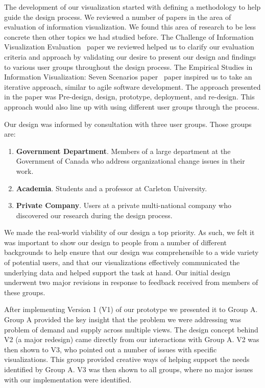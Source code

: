 \documentclass[journal]{vgtc}                %
\begin{document}
The development of our visualization started with defining a methodology to help guide the design process.  We reviewed a number of papers in the area of evaluation of information visualization.  We found this area of research to be less concrete then other topics we had studied before.  The Challenge of Information Visualization Evaluation~\cite{challengeofinfoviseval} paper we reviewed helped us to clarify our evaluation criteria and approach by validating our desire to present our design and findings to various user groups throughout the design process.  The Empirical Studies in Information Visualization: Seven Scenarios paper~\cite{lam2012empirical} paper inspired us to take an iterative approach, similar to agile software development.  The approach presented in the paper was Pre-design, design, prototype, deployment, and re-design.  This approach would also line up with using different user groups through the process.

Our design was informed by consultation with three user groups. Those groups are:

\begin{enumerate}[label=(\Alph*)]
\item  \textbf{Government Department}. Members of a large department at the Government of Canada who address organizational change issues in their work.
\item \textbf{Academia}. Students and a professor at Carleton University.
\item \textbf{Private Company}. Users at a private multi-national company who discovered our research during the design process.
\end{enumerate}

We made the real-world viability of our design a top priority. As such, we felt it was important to show our design to people from a number of different backgrounds to help ensure that our design was comprehensible to a wide variety of potential users, and that our visualizations effectively communicated the underlying data and helped support the task at hand. Our initial design underwent two major revisions in response to feedback received from members of these groups. 

After implementing Version 1 (V1) of our prototype we presented it to Group A. Group A provided the key insight that the problem we were addressing was problem of demand and supply across multiple views. The design concept behind V2 (a major redesign) came directly from our interactions with Group A. V2 was then shown to V3, who pointed out a number of issues with specific visualizations.  This group provided creative ways of helping support the needs identified by Group A. V3 was then shown to all groups, where no major issues with our implementation were identified.
\end{document}
